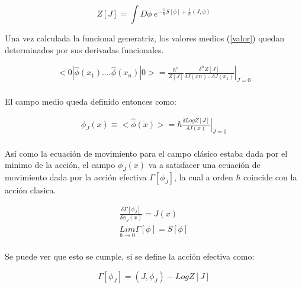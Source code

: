 \begin{equation}
Z [J] = 
\int D \phi \ e ^{- \frac{1}{ \hbar} S[ \phi ] + \frac{1}{\hbar} (J, \phi )}
\label{eq.generatriz}
\end{equation}

Una vez calculada la funcional generatriz, los valores medios (\ref{valor}) quedan determinados por sus derivadas funcionales.

\begin{equation}
\begin{array}{c}
< 0 | \hat{ \phi  } (x _1) .... \hat{\phi  } (x _n) | 0 > = \frac{\hbar ^n}{Z[J]}
\left. \frac{\delta ^n  Z[J] }{ \delta J(xn) ... \delta J(x _1) } 		\right| _{J=0}\\[10pt]
\end{array}
\end{equation}

El campo medio queda definido entonces como:

\begin{equation}
\begin{array}{c}
\phi _J (x) \equiv < \hat{\phi } (x) > = \hbar \left. \frac{\delta Log Z[J] }{\delta J(x)} \right| _{J=0} \\[10pt]
\end{array}
\end{equation}



Así como la ecuación de movimiento para el campo clásico estaba dada por el minimo de la acción, el campo $ \phi _J (x) $ va a satisfacer una ecuación de movimiento dada por la acción efectiva $ \Gamma [\phi _J] $, la cual a orden $\hbar$ coincide con la acción clasica.


\begin{equation}
\begin{array}{c}
\frac{\delta \Gamma [ \phi _J ]  }{\delta \phi _J (x)  } = 
J (x) \\[10pt]
\underset{ \hbar \rightarrow 0 }{ Lim  } \Gamma [ \phi  ] = S [ \phi ] \\[10pt]
\end{array}
\label{eq.accion1}
\end{equation}

Se puede ver que esto se cumple, si se define la acción efectiva como:

\begin{equation}
\Gamma [\phi _J] = (J, \phi _J) - Log Z [J]
\label{efectiva}
\end{equation}

